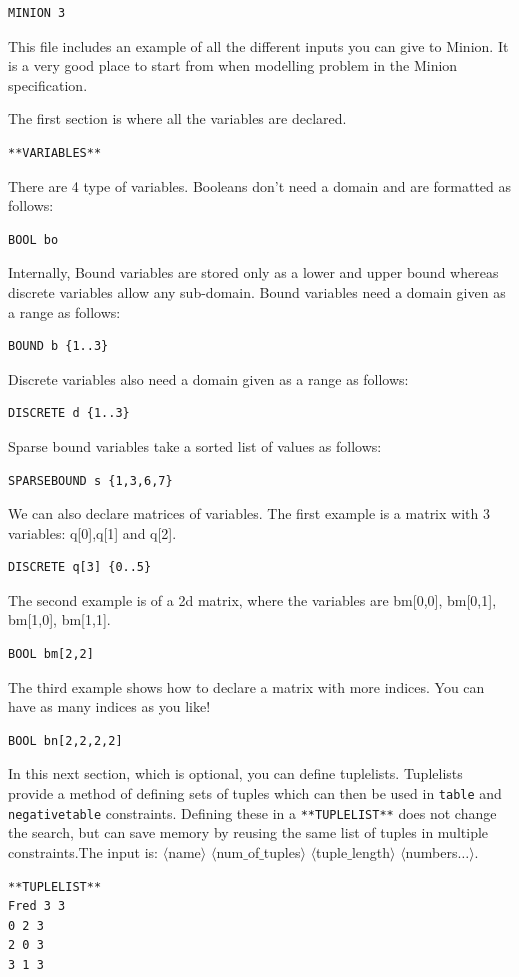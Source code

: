 \documentclass[oneside]{book}
\begin{document}
\begin{verbatim}
MINION 3
\end{verbatim}

This file includes an example of all the different inputs  you can give to Minion.  It is a very good place to start from when modelling  problem in the Minion specification. 

 The first section is where all the variables are declared.
 \begin{verbatim}
**VARIABLES**
\end{verbatim}

There are 4 type of variables. Booleans don't need a domain and are formatted as follows:
 \begin{verbatim}
BOOL bo    
 \end{verbatim}

Internally, Bound variables are stored only as a lower  and upper bound whereas discrete variables allow any sub-domain.
Bound variables need a domain given as a range as follows: 
 \begin{verbatim}
BOUND b {1..3}   
 \end{verbatim}

Discrete variables also need a domain given as a range as follows:   
\begin{verbatim}
DISCRETE d {1..3} 
\end{verbatim}

Sparse bound variables take a sorted list of values as follows:
\begin{verbatim}
SPARSEBOUND s {1,3,6,7} 
\end{verbatim}

We can also declare matrices of variables. The first example is a matrix with 3 variables: q[0],q[1] and q[2].
\begin{verbatim}
DISCRETE q[3] {0..5} 
\end{verbatim}

The second example is of a 2d matrix, where the variables are bm[0,0], bm[0,1], bm[1,0], bm[1,1].
\begin{verbatim}
BOOL bm[2,2] 
\end{verbatim}

The third example shows how to declare a matrix with more indices. You can have as many indices as you like!
\begin{verbatim}
BOOL bn[2,2,2,2] 
\end{verbatim}

In this next section, which is optional, you can define tuplelists. Tuplelists provide a method of defining sets of tuples which can then be used in \texttt{table} and \texttt{negativetable} constraints. Defining these in a \texttt{**TUPLELIST**} does not change the search, but can save memory by reusing the same list of tuples in multiple constraints.The input is: $\langle$name$\rangle$ $\langle$num$\_$of$\_$tuples$\rangle$ $\langle$tuple$\_$length$\rangle$ $\langle$numbers$\ldots \rangle$.
\begin{verbatim}
**TUPLELIST**
Fred 3 3
0 2 3
2 0 3
3 1 3
\end{verbatim}
\end{document}
